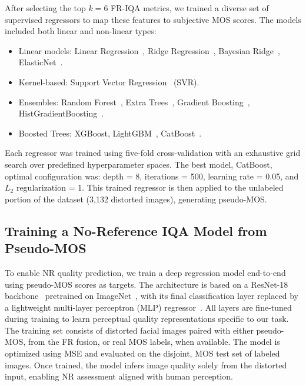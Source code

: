 After selecting the top $k = 6$ FR-IQA metrics, we trained a diverse set of supervised regressors to map these features to subjective MOS scores. The models included both linear and non-linear types:

\begin{itemize}
    \item Linear models: Linear Regression~\cite{linearregression}, Ridge Regression~\cite{ridgeregression}, Bayesian Ridge~\cite{bayesianridge}, ElasticNet~\cite{elasticnet}.
    \item Kernel-based: Support Vector Regression~\cite{svr} (SVR).
    \item Ensembles: Random Forest~\cite{randomforest}, Extra Trees~\cite{ensembles}, Gradient Boosting~\cite{gradboosting}, HistGradientBoosting~\cite{histboost}.
    \item Boosted Trees: XGBoost\cite{xgboost}, LightGBM~\cite{lightgbm}, CatBoost~\cite{catboost}.
\end{itemize}

Each regressor was trained using five-fold cross-validation with an exhaustive grid search over predefined hyperparameter spaces. The best model, CatBoost, optimal configuration was: depth = 8, iterations = 500, learning rate = 0.05, and $L_2$ regularization = 1. This trained regressor is then applied to the unlabeled portion of the dataset (3,132 distorted images), generating pseudo-MOS.\@

\subsection{Training a No-Reference IQA Model from Pseudo-MOS}

To enable NR quality prediction, we train a deep regression model end-to-end using pseudo-MOS scores as targets. The architecture is based on a ResNet-18 backbone~\cite{resnet} pretrained on ImageNet~\cite{imagenet}, with its final classification layer replaced by a lightweight multi-layer perceptron (MLP) regressor~\cite{bayesianridge}. All layers are fine-tuned during training to learn perceptual quality representations specific to our task. The training set consists of distorted facial images paired with either pseudo-MOS, from the FR fusion, or real MOS labels, when available. The model is optimized using MSE and evaluated on the disjoint, MOS test set of labeled images. Once trained, the model infers image quality solely from the distorted input, enabling NR assessment aligned with human perception.

